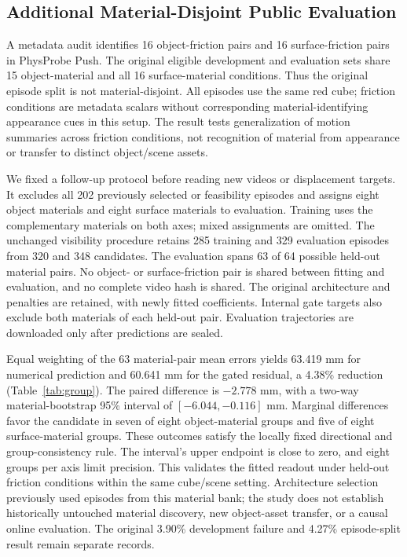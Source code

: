 \documentclass{ieeeaccess}
\begin{document}
\subsection{Additional Material-Disjoint Public Evaluation}\label{sec:group}
A metadata audit identifies 16 object-friction pairs and 16 surface-friction pairs in PhysProbe Push. The original eligible development and evaluation sets share 15 object-material and all 16 surface-material conditions. Thus the original episode split is not material-disjoint. All episodes use the same red cube; friction conditions are metadata scalars without corresponding material-identifying appearance cues in this setup. The result tests generalization of motion summaries across friction conditions, not recognition of material from appearance or transfer to distinct object/scene assets.

We fixed a follow-up protocol before reading new videos or displacement targets. It excludes all 202 previously selected or feasibility episodes and assigns eight object materials and eight surface materials to evaluation. Training uses the complementary materials on both axes; mixed assignments are omitted. The unchanged visibility procedure retains 285 training and 329 evaluation episodes from 320 and 348 candidates. The evaluation spans 63 of 64 possible held-out material pairs. No object- or surface-friction pair is shared between fitting and evaluation, and no complete video hash is shared. The original architecture and penalties are retained, with newly fitted coefficients. Internal gate targets also exclude both materials of each held-out pair. Evaluation trajectories are downloaded only after predictions are sealed.

Equal weighting of the 63 material-pair mean errors yields 63.419 mm for numerical prediction and 60.641 mm for the gated residual, a 4.38\% reduction (Table~\ref{tab:group}). The paired difference is $-2.778$ mm, with a two-way material-bootstrap 95\% interval of $[-6.044,-0.116]$ mm. Marginal differences favor the candidate in seven of eight object-material groups and five of eight surface-material groups. These outcomes satisfy the locally fixed directional and group-consistency rule. The interval's upper endpoint is close to zero, and eight groups per axis limit precision. This validates the fitted readout under held-out friction conditions within the same cube/scene setting. Architecture selection previously used episodes from this material bank; the study does not establish historically untouched material discovery, new object-asset transfer, or a causal online evaluation. The original 3.90\% development failure and 4.27\% episode-split result remain separate records.
\end{document}
